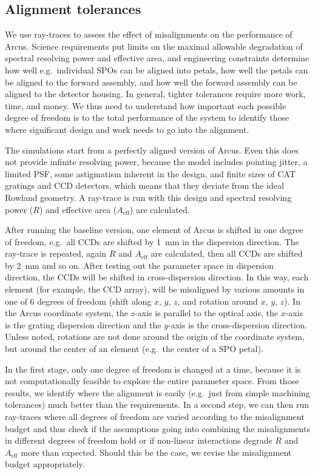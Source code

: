 \documentclass[12pt]{spieman}  %
\begin{document}
\begin{spacing}{2}
\section{Alignment tolerances}
We use ray-traces to assess the effect of misalignments on the performance of Arcus. Science requirements put limits on the maximal allowable degradation of spectral resolving power and effective area, and engineering constraints determine how well e.g.\ individual SPOs can be aligned into petals, how well the petals can be aligned to the forward assembly, and how well the forward assembly can be aligned to the detector housing. In general, tighter tolerances require more work, time, and money. We thus need to understand how important each possible degree of freedom is to the total performance of the system to identify those where significant design and work needs to go into the alignment.

The simulations start from a perfectly aligned version of Arcus. Even this does not provide infinite resolving power, because the model includes pointing jitter, a limited PSF, some astigmatism inherent in the design, and finite sizes of CAT gratings and CCD detectors, which means that they deviate from the ideal Rowland geometry. A ray-trace is run with this design and spectral resolving power ($R$) and effective area ($A_\mathrm{eff}$) are calculated.

After running the baseline version, one element of Arcus is shifted in one degree of freedom, e.g.\ all CCDs are shifted by 1~mm in the dispersion direction. The ray-trace is repeated, again $R$ and $A_\mathrm{eff}$ are calculated, then all CCDs are shifted by 2~mm and so on. After testing out the parameter space in dispersion direction, the CCDs will be shifted in cross-dispersion direction. In this way, each element (for example, the CCD array), will be misaligned by various amounts in one of 6 degrees of freedom (shift along $x$, $y$, $z$, and rotation around $x$, $y$, $z$).
In the Arcus coordinate system, the $z$-axis is parallel to the optical axis, the $x$-axis is the grating dispersion direction and the $y$-axis is the cross-dispersion direction. Unless noted, rotations are not done around the origin of the coordinate system, but around the center of an element (e.g.\ the center of a SPO petal).

In the first stage, only one degree of freedom is changed at a time, because it is not computationally feasible to explore the entire parameter space. From those results, we identify where the alignment is easily (e.g.\ just from simple machining tolerances) much better than the requirements. In a second step, we can then run ray-traces where all degrees of freedom are varied according to the misalignment budget and thus check if the assumptions going into combining the misalignments in different degrees of freedom hold or if non-linear interactions degrade $R$ and $A_\mathrm{eff}$ more than expected. Should this be the case, we revise the misalignment budget appropriately.


\end{spacing}
\end{document}
